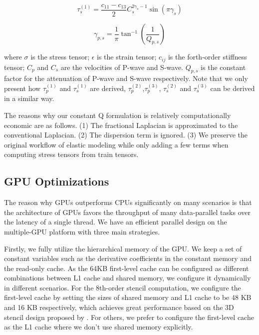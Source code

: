 \documentclass{paris17}
\begin{document}
\begin{equation}
  \tau_s^{(1)} = \frac{c_{11} - c_{13}}{2}C_s^{2\gamma_s - 1}\sin(\pi \gamma_s)
\end{equation}

\begin{equation}
  \gamma_{p,s}=\frac{1}{\pi}\tan^{-1}(\frac{1}{Q_{p,s}})
\end{equation}

where $\sigma$ is the stress tensor; $\epsilon$ is the strain tensor; $c_{ij}$ is the forth-order stiffness tensor; $C_p$ and $C_s$ are the velocities of P-wave and S-wave. $Q_{p,s}$ is the constant factor for the attenuation of P-wave and S-wave respectively. Note that we only present how $\tau_p^{(1)}$ and $\tau_s^{(1)}$ are derived, $\tau_p^{(2)}$,$\tau_p^{(3)}$, $\tau_s^{(2)}$ and $\tau_s^{(3)}$ can be derived in a similar way.

The reasons why our constant Q formulation is relatively computationally economic are as follows. (1) The fractional Laplacian is approximated to the conventional Laplacian. (2) The dispersion term is ignored. (3) We preserve the original workflow of elastic modeling while only adding a few terms when computing stress tensors from train tensors.

\subsection{GPU Optimizations}

The reason why GPUs outperforms CPUs significantly on many scenarios is that the architecture of GPUs favors the throughput of many data-parallel tasks over the latency of a single thread. We have an efficient parallel design on the multiple-GPU platform with three main strategies.

Firstly, we fully utilize the hierarchical memory of the GPU. We keep a set of constant variables such as the derivative coefficients in the constant memory and the read-only cache. As the 64KB first-level cache can be configured as different combinations between L1 cache and shared memory, we configure it dynamically in different scenarios. For the 8th-order stencil computation, we configure the first-level cache by setting the sizes of shared memory and L1 cache to be 48 KB and 16 KB respectively, which achieves great performance based on the 3D stencil design proposed by \cite{micikevicius20093d}. For others, we prefer to configure the first-level cache as the L1 cache where we don't use shared memory explicitly.
\end{document}
